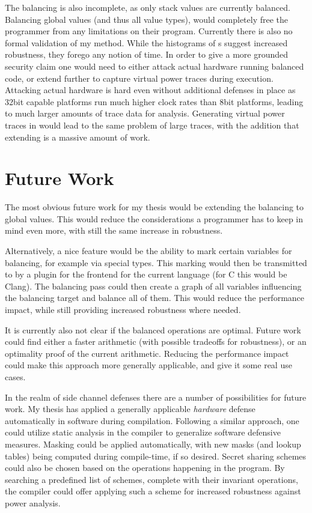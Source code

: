 The balancing is also incomplete, as only stack values are currently balanced.
Balancing global values (and thus all value types), would completely free the programmer from any limitations on their program.
Currently there is also no formal validation of my method.
While the histograms of \hammingw{}s suggest increased robustness, they forego any notion of time.
In order to give a more grounded security claim one would need to either attack actual hardware running balanced code, or extend \qemu{} further to capture virtual power traces during execution.
Attacking actual hardware is hard even without additional defenses in place as 32bit capable platforms run much higher clock rates than 8bit platforms, leading to much larger amounts of trace data for analysis.
Generating virtual power traces in \qemu{} would lead to the same problem of large traces, with the addition that extending \qemu{} is a massive amount of work.

\section{Future Work}
The most obvious future work for my thesis would be extending the balancing to global values.
This would reduce the considerations a programmer has to keep in mind even more, with still the same increase in robustness.

Alternatively, a nice feature would be the ability to mark certain variables for balancing, for example via special types.
This marking would then be transmitted to \ir{} by a plugin for the frontend for the current language (for C this would be Clang).
The balancing pass could then create a graph of all variables influencing the balancing target and balance all of them.
This would reduce the performance impact, while still providing increased robustness where needed.

It is currently also not clear if the balanced operations are optimal.
Future work could find either a faster arithmetic (with possible tradeoffs for robustness), or an optimality proof of the current arithmetic.
Reducing the performance impact could make this approach more generally applicable, and give it some real use cases.

In the realm of side channel defenses there are a number of possibilities for future work.
My thesis has applied a generally applicable \emph{hardware} defense automatically in software during compilation.
Following a similar approach, one could utilize static analysis in the compiler to generalize software defensive measures.
Masking could be applied automatically, with new masks (and lookup tables) being computed during compile-time, if so desired.
Secret sharing schemes could also be chosen based on the operations happening in the program.
By searching a predefined list of schemes, complete with their invariant operations, the compiler could offer applying such a scheme for increased robustness against power analysis.

